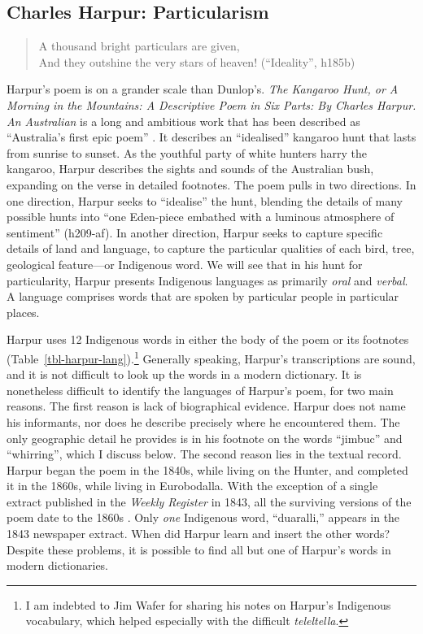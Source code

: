 \documentclass[
  Crown,
  times,
  sageh]{sagej}
\begin{document}
\subsection{Charles Harpur:
Particularism}\label{charles-harpur-particularism}

\begin{quote}
A thousand bright particulars are given,\\
And they outshine the very stars of heaven! (``Ideality'', h185b)
\end{quote}

Harpur's poem is on a grander scale than Dunlop's. \emph{The Kangaroo
Hunt, or A Morning in the Mountains: A Descriptive Poem in Six Parts: By
Charles Harpur. An Australian} is a long and ambitious work that has
been described as ``Australia's first epic poem''
\citep[81]{gelder_colonial_2020}. It describes an ``idealised'' kangaroo
hunt that lasts from sunrise to sunset. As the youthful party of white
hunters harry the kangaroo, Harpur describes the sights and sounds of
the Australian bush, expanding on the verse in detailed footnotes. The
poem pulls in two directions. In one direction, Harpur seeks to
``idealise'' the hunt, blending the details of many possible hunts into
``one Eden-piece embathed with a luminous atmosphere of sentiment''
(h209-af). In another direction, Harpur seeks to capture specific
details of land and language, to capture the particular qualities of
each bird, tree, geological feature---or Indigenous word. We will see
that in his hunt for particularity, Harpur presents Indigenous languages
as primarily \emph{oral} and \emph{verbal}. A language comprises words
that are spoken by particular people in particular places.

Harpur uses 12 Indigenous words in either the body of the poem or its
footnotes (Table~\ref{tbl-harpur-lang}).\footnote{I am indebted to Jim
  Wafer for sharing his notes on Harpur's Indigenous vocabulary, which
  helped especially with the difficult \emph{teleltella}.} Generally
speaking, Harpur's transcriptions are sound, and it is not difficult to
look up the words in a modern dictionary. It is nonetheless difficult to
identify the languages of Harpur's poem, for two main reasons. The first
reason is lack of biographical evidence. Harpur does not name his
informants, nor does he describe precisely where he encountered them.
The only geographic detail he provides is in his footnote on the words
``jimbuc'' and ``whirring'', which I discuss below. The second reason
lies in the textual record. Harpur began the poem in the 1840s, while
living on the Hunter, and completed it in the 1860s, while living in
Eurobodalla. With the exception of a single extract published in the
\emph{Weekly Register} in 1843, all the surviving versions of the poem
date to the 1860s \citep{harpur_australian_1843}. Only \emph{one}
Indigenous word, ``duaralli,'' appears in the 1843 newspaper extract.
When did Harpur learn and insert the other words? Despite these
problems, it is possible to find all but one of Harpur's words in modern
dictionaries.
\end{document}
